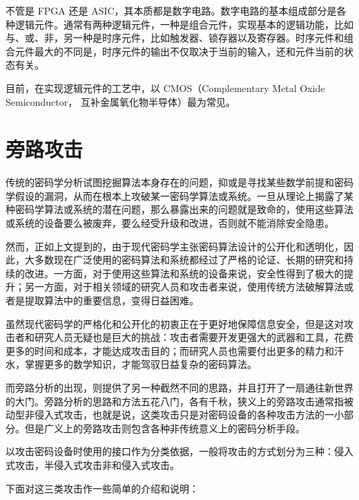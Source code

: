 不管是 FPGA 还是 ASIC，其本质都是数字电路。数字电路的基本组成部分是各种逻辑元件。通常有两种逻辑元件，一种是组合元件，实现基本的逻辑功能，比如与、或、非，另一种是时序元件，比如触发器、锁存器以及寄存器。时序元件和组合元件最大的不同是，时序元件的输出不仅取决于当前的输入，还和元件当前的状态有关。

目前，在实现逻辑元件的工艺中，以 CMOS（Complementary Metal Oxide Semiconductor， 互补金属氧化物半导体）最为常见。

\section{旁路攻击} %
传统的密码学分析试图挖掘算法本身存在的问题，抑或是寻找某些数学前提和密码学假设的漏洞，从而在根本上攻破某一密码学算法或系统。一旦从理论上揭露了某种密码学算法或系统的潜在问题，那么暴露出来的问题就是致命的，使用这些算法或系统的设备要么被废弃，要么经受升级和改进，否则就不能消除安全隐患。

然而，正如上文提到的，由于现代密码学主张密码算法设计的公开化和透明化，因此，大多数现在广泛使用的密码算法和系统都经过了严格的论证、长期的研究和持续的改进。一方面，对于使用这些算法和系统的设备来说，安全性得到了极大的提升；另一方面，对于相关领域的研究人员和攻击者来说，使用传统方法破解算法或者是提取算法中的重要信息，变得日益困难。

虽然现代密码学的严格化和公开化的初衷正在于更好地保障信息安全，但是这对攻击者和研究人员无疑也是巨大的挑战：攻击者需要开发更强大的武器和工具，花费更多的时间和成本，才能达成攻击目的；而研究人员也需要付出更多的精力和汗水，掌握更多的数学知识，才能驾驭日益复杂的密码算法。

而旁路分析的出现，则提供了另一种截然不同的思路，并且打开了一扇通往新世界的大门。旁路分析的思路和方法五花八门，各有千秋，狭义上的旁路攻击通常指被动型非侵入式攻击，也就是说，这类攻击只是对密码设备的各种攻击方法的一小部分。但是广义上的旁路攻击则包含各种非传统意义上的密码分析手段。

以攻击密码设备时使用的接口作为分类依据，一般将攻击的方式划分为三种：侵入式攻击，半侵入式攻击非和侵入式攻击。

\vspace*{\baselineskip}

下面对这三类攻击作一些简单的介绍和说明： \cite{paa_cn}

